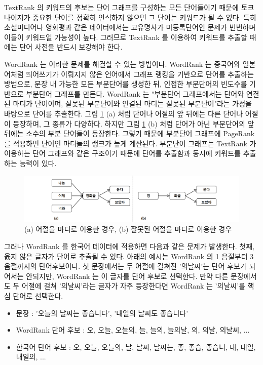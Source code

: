 \documentclass[oneside, ko,phd]{snuthesis_utf8_kor}
\begin{document}
TextRank 의 키워드의 후보는 단어 그래프를 구성하는 모든 단어들이기 때문에 토크나이저가 중요한 단어를 정확히 인식하지 않으면 그 단어는 키워드가 될 수 없다.
특히 소셜미디어나 영화평과 같은 데이터에서는 고유명사가 미등록단어인 문제가 빈번하며 이들이 키워드일 가능성이 높다.
그러므로 TextRank 를 이용하여 키워드를 추출할 때에는 단어 사전을 반드시 보강해야 한다.

WordRank \cite{chen2011simple} 는 이러한 문제를 해결할 수 있는 방법이다.
WordRank 는 중국어와 일본어처럼 띄어쓰기가 이뤄지지 않은 언어에서 그래프 랭킹을 기반으로 단어를 추출하는 방법으로, 문장 내 가능한 모든 부분단어를 생성한 뒤, 인접한 부분단어의 빈도수를 기반으로 부분단어 그래프를 만든다.
WordRank 는 "부분단어 그래프에서는 단어와 연결된 마디가 단어이며, 잘못된 부분단어와 연결된 마디는 잘못된 부분단어"라는 가정을 바탕으로 단어를 추출한다.
그림 \ref{fig:keyword_krwordrank_assumption} (a) 처럼 단어나 어절의 앞 뒤에는 다른 단어나 어절이 등장하며, 그 종류가 다양하다.
하지만 그림 \ref{fig:keyword_krwordrank_assumption} (b) 처럼 단어가 아닌 부분단어의 앞 뒤에는 소수의 부분 단어들이 등장한다.
그렇기 때문에 부분단어 그래프에 PageRank 를 적용하면 단어인 마디들의 랭크가 높게 계산된다.
부분단어 그래프는 TextRank 가 이용하는 단어 그래프와 같은 구조이기 때문에 단어를 추출함과 동시에 키워드를 추출하는 능력이 있다.

\begin{figure}[H]
\centering
\includegraphics[keepaspectratio=true, width=0.9\linewidth]{fig/keyword_krwordrank_assumption.png}
\caption{(a) 어절을 마디로 이용한 경우, (b) 잘못된 어절을 마디로 이용한 경우}
\label{fig:keyword_krwordrank_assumption}
\end{figure}

그러나 WordRank 를 한국어 데이터에 적용하면 다음과 같은 문제가 발생한다.
첫째, 옳지 않은 글자가 단어로 추출될 수 있다.
아래의 예시는 WordRank 의 1 음절부터 3 음절까지의 단어후보이다.
첫 문장에서는 두 어절에 걸쳐진 '의날씨'는 단어 후보가 되어서는 안되지만, WordRank 는 이 글자를 단어 후보로 선택한다.
만약 다른 문장에서도 두 어절에 걸쳐 '의날씨'라는 글자가 자주 등장한다면 WordRank 는 '의날씨'를 핵심 단어로 선택한다.

\begin{itemize}
  \item 문장 : '오늘의 날씨는 좋습니다', '내일의 날씨도 좋습니다'
  \item WordRank 단어 후보 : 오, 오늘, 오늘의, 늘, 늘의, 늘의날, 의, 의날, 의날씨, ...
  \item 한국어 단어 후보 : 오, 오늘, 오늘의, 날, 날씨, 날씨는, 좋, 좋습, 좋습니, 내, 내일, 내일의, ...
\end{itemize}
\end{document}

